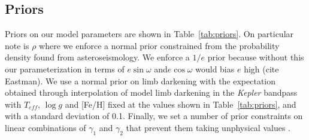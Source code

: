 \documentclass[apjl]{emulateapj}
\begin{document}






\subsection{Priors}
Priors on our model parameters are shown in Table~\ref{tab:priors}. On particular note is $\rho$ where we enforce a normal prior constrained from the probability density found from asteroseismology. We enforce a $1/e$ prior because without this our parameterization in terms of $e\sin{\omega}$ and$e\cos{\omega}$ would bias $e$ high (cite Eastman). We use a normal prior on limb darkening with the expectation obtained through interpolation of model limb darkening in the \emph{Kepler} bandpass with $T_{eff}$, $\log{g}$ and [Fe/H] fixed at the values shown in Table~\ref{tab:priors}, and with a standard deviation of 0.1. Finally, we set a number of prior constraints on linear combinations of $\gamma_1$ and $\gamma_2$ that prevent them taking unphysical values \citep{burke08}.
\end{document}
